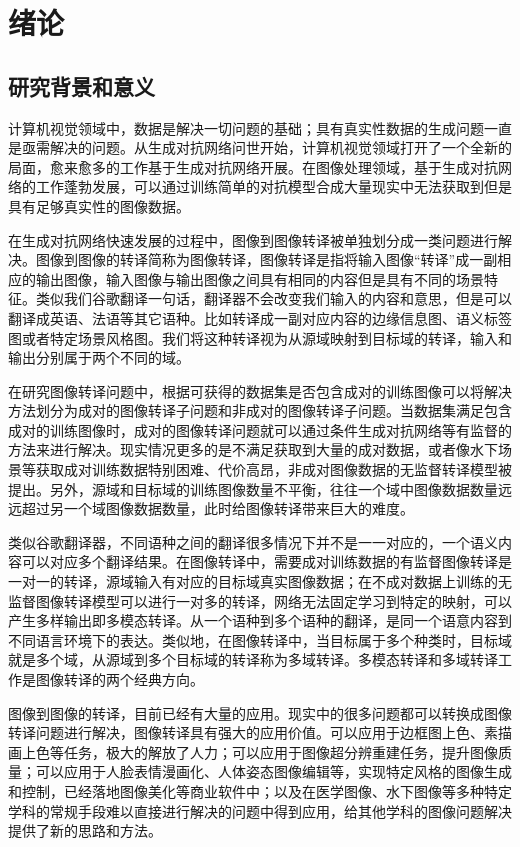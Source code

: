 \chapter{绪论}
\section{研究背景和意义}

计算机视觉领域中，数据是解决一切问题的基础；具有真实性数据的生成问题一直是亟需解决的问题。从生成对抗网络问世开始，计算机视觉领域打开了一个全新的局面，愈来愈多的工作基于生成对抗网络开展。在图像处理领域，基于生成对抗网络的工作蓬勃发展，可以通过训练简单的对抗模型合成大量现实中无法获取到但是具有足够真实性的图像数据。

在生成对抗网络快速发展的过程中，图像到图像转译被单独划分成一类问题进行解决。图像到图像的转译简称为图像转译，图像转译是指将输入图像“转译”成一副相应的输出图像，输入图像与输出图像之间具有相同的内容但是具有不同的场景特征。类似我们谷歌翻译一句话，翻译器不会改变我们输入的内容和意思，但是可以翻译成英语、法语等其它语种。比如转译成一副对应内容的边缘信息图、语义标签图或者特定场景风格图。我们将这种转译视为从源域映射到目标域的转译，输入和输出分别属于两个不同的域。

在研究图像转译问题中，根据可获得的数据集是否包含成对的训练图像可以将解决方法划分为成对的图像转译子问题和非成对的图像转译子问题。当数据集满足包含成对的训练图像时，成对的图像转译问题就可以通过条件生成对抗网络等有监督的方法来进行解决。现实情况更多的是不满足获取到大量的成对数据，或者像水下场景等获取成对训练数据特别困难、代价高昂，非成对图像数据的无监督转译模型被提出。另外，源域和目标域的训练图像数量不平衡，往往一个域中图像数据数量远远超过另一个域图像数据数量，此时给图像转译带来巨大的难度。

类似谷歌翻译器，不同语种之间的翻译很多情况下并不是一一对应的，一个语义内容可以对应多个翻译结果。在图像转译中，需要成对训练数据的有监督图像转译是一对一的转译，源域输入有对应的目标域真实图像数据；在不成对数据上训练的无监督图像转译模型可以进行一对多的转译，网络无法固定学习到特定的映射，可以产生多样输出即多模态转译。从一个语种到多个语种的翻译，是同一个语意内容到不同语言环境下的表达。类似地，在图像转译中，当目标属于多个种类时，目标域就是多个域，从源域到多个目标域的转译称为多域转译。多模态转译和多域转译工作是图像转译的两个经典方向。

图像到图像的转译，目前已经有大量的应用。现实中的很多问题都可以转换成图像转译问题进行解决，图像转译具有强大的应用价值。可以应用于边框图上色、素描画上色等任务，极大的解放了人力；可以应用于图像超分辨重建任务，提升图像质量；可以应用于人脸表情漫画化、人体姿态图像编辑等，实现特定风格的图像生成和控制，已经落地图像美化等商业软件中；以及在医学图像、水下图像等多种特定学科的常规手段难以直接进行解决的问题中得到应用，给其他学科的图像问题解决提供了新的思路和方法。

